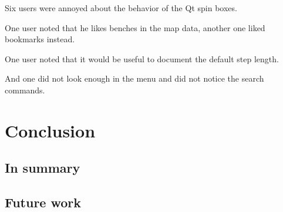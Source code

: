 \documentclass[nolof,digital]{fithesis3}
\begin{document}
Six users were annoyed about the behavior of the Qt spin boxes.

One user noted that he likes benches in the map data, another one liked bookmarks instead.

One user noted that it would be useful to document the default step length.

And one did not look enough in the menu and did not notice the search commands.
\chapter{Conclusion}
\section{In summary}
\section{Future work}
\end{document}
